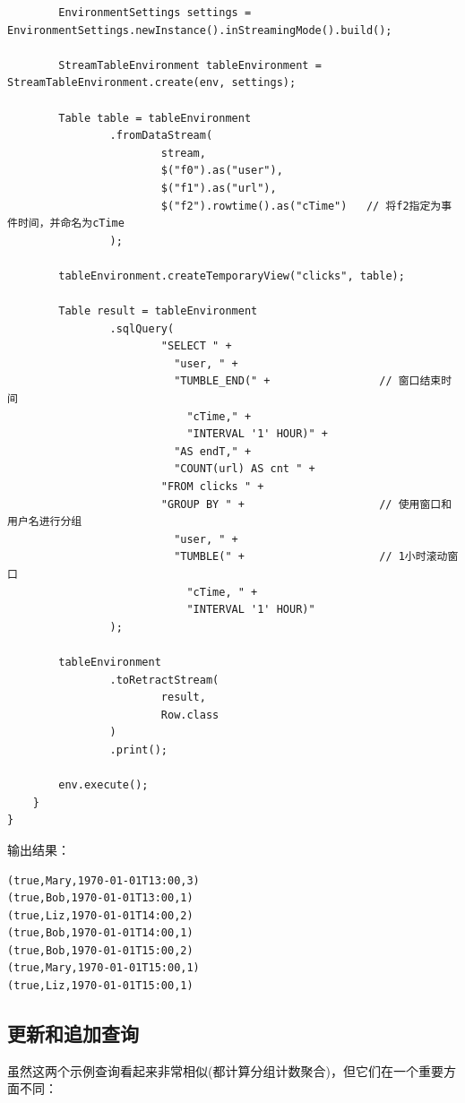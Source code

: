 \documentclass[cn,11pt,chinese]{elegantbook}
\begin{document}
\begin{verbatim}
        EnvironmentSettings settings = EnvironmentSettings.newInstance().inStreamingMode().build();

        StreamTableEnvironment tableEnvironment = StreamTableEnvironment.create(env, settings);

        Table table = tableEnvironment
                .fromDataStream(
                        stream,
                        $("f0").as("user"),
                        $("f1").as("url"),
                        $("f2").rowtime().as("cTime")   // 将f2指定为事件时间，并命名为cTime
                );

        tableEnvironment.createTemporaryView("clicks", table);

        Table result = tableEnvironment
                .sqlQuery(
                        "SELECT " +
                          "user, " +
                          "TUMBLE_END(" +                 // 窗口结束时间
                            "cTime," +
                            "INTERVAL '1' HOUR)" +
                          "AS endT," +
                          "COUNT(url) AS cnt " +
                        "FROM clicks " +
                        "GROUP BY " +                     // 使用窗口和用户名进行分组
                          "user, " +
                          "TUMBLE(" +                     // 1小时滚动窗口
                            "cTime, " +
                            "INTERVAL '1' HOUR)"
                );

        tableEnvironment
                .toRetractStream(
                        result,
                        Row.class
                )
                .print();

        env.execute();
    }
}
\end{verbatim}

输出结果：

\begin{verbatim}
(true,Mary,1970-01-01T13:00,3)
(true,Bob,1970-01-01T13:00,1)
(true,Liz,1970-01-01T14:00,2)
(true,Bob,1970-01-01T14:00,1)
(true,Bob,1970-01-01T15:00,2)
(true,Mary,1970-01-01T15:00,1)
(true,Liz,1970-01-01T15:00,1)
\end{verbatim}

\subsection{更新和追加查询}

虽然这两个示例查询看起来非常相似(都计算分组计数聚合)，但它们在一个重要方面不同：
\end{document}
